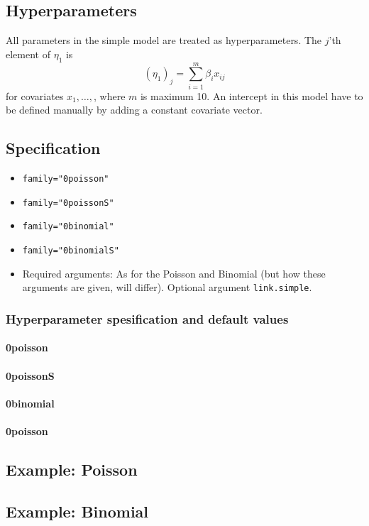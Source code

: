 \documentclass[a4paper,11pt]{article}
\begin{document}
\subsection*{Hyperparameters}

All parameters in the simple model are treated as hyperparameters.
The $j$'th element of $\eta_1$ is
\begin{displaymath}
    (\eta_1)_j = \sum_{i=1}^{m} \beta_i x_{ij}
\end{displaymath}
for covariates $x_1, \ldots, $, where $m$ is maximum 10. An intercept
in this model have to be defined manually by adding a constant
covariate vector.

\subsection*{Specification}

\begin{itemize}
\item \texttt{family="0poisson"}
\item \texttt{family="0poissonS"}
\item \texttt{family="0binomial"}
\item \texttt{family="0binomialS"}
\item Required arguments: As for the Poisson and Binomial (but how
    these arguments are given, will differ). Optional argument
    \texttt{link.simple}.
\end{itemize}

\subsubsection*{Hyperparameter spesification and default values}
\paragraph{0poisson}
{\small }
\paragraph{0poissonS}
{\small }
\paragraph{0binomial}
{\small }
\paragraph{0poisson}
{\small }


\clearpage
\subsection*{Example: Poisson}
{\small }

\clearpage
\subsection*{Example: Binomial}
{\small }
\end{document}
